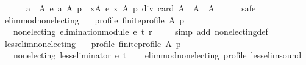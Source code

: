 \begin{isabellebody}
\ \ \ \ \ \ {\isacharbraceleft}{\kern0pt}a\ {\isasymin}\ A{\isachardot}{\kern0pt}\ e\ a\ A\ p\ {\isasymle}\ {\isacharparenleft}{\kern0pt}{\isasymSum}x{\isasymin}A{\isachardot}{\kern0pt}\ e\ x\ A\ p{\isacharparenright}{\kern0pt}\ div\ card\ A{\isacharbraceright}{\kern0pt}\ {\isasymunion}\ A\ {\isacharequal}{\kern0pt}\ A{\isachardoublequoteclose}\isanewline
\ \ \ \ \isamarkupfalse%
\ safe\isanewline
{}\isamarkupfalse%
%
\endisatagproof
{\isafoldproof}%
%
\isadelimproof
%
\endisadelimproof
%
\isadelimdocument
%
\endisadelimdocument
%
\isatagdocument
%
\isamarkuptrue%
%
\endisatagdocument
{\isafolddocument}%
%
\isadelimdocument
%
\endisadelimdocument
{}\isamarkupfalse%
\ elim{\isacharunderscore}{\kern0pt}mod{\isacharunderscore}{\kern0pt}non{\isacharunderscore}{\kern0pt}electing{\isacharcolon}{\kern0pt}\isanewline
\ \ \ profile{\isacharcolon}{\kern0pt}\ {\isachardoublequoteopen}finite{\isacharunderscore}{\kern0pt}profile\ A\ p{\isachardoublequoteclose}\isanewline
\ \ \ {\isachardoublequoteopen}non{\isacharunderscore}{\kern0pt}electing\ {\isacharparenleft}{\kern0pt}elimination{\isacharunderscore}{\kern0pt}module\ e\ t\ r\ {\isacharparenright}{\kern0pt}{\isachardoublequoteclose}\isanewline
%
\isadelimproof
\ \ %
\endisadelimproof
%
\isatagproof
{}\isamarkupfalse%
\ {\isacharparenleft}{\kern0pt}simp\ add{\isacharcolon}{\kern0pt}\ non{\isacharunderscore}{\kern0pt}electing{\isacharunderscore}{\kern0pt}def{\isacharparenright}{\kern0pt}%
\endisatagproof
{\isafoldproof}%
%
\isadelimproof
\isanewline
%
\endisadelimproof
\isanewline
{}\isamarkupfalse%
\ less{\isacharunderscore}{\kern0pt}elim{\isacharunderscore}{\kern0pt}non{\isacharunderscore}{\kern0pt}electing{\isacharcolon}{\kern0pt}\isanewline
\ \ \ profile{\isacharcolon}{\kern0pt}\ {\isachardoublequoteopen}finite{\isacharunderscore}{\kern0pt}profile\ A\ p{\isachardoublequoteclose}\isanewline
\ \ \ {\isachardoublequoteopen}non{\isacharunderscore}{\kern0pt}electing\ {\isacharparenleft}{\kern0pt}less{\isacharunderscore}{\kern0pt}eliminator\ e\ t{\isacharparenright}{\kern0pt}{\isachardoublequoteclose}\isanewline
%
\isadelimproof
\ \ %
\endisadelimproof
%
\isatagproof
{}\isamarkupfalse%
\ elim{\isacharunderscore}{\kern0pt}mod{\isacharunderscore}{\kern0pt}non{\isacharunderscore}{\kern0pt}electing\ profile\ less{\isacharunderscore}{\kern0pt}elim{\isacharunderscore}{\kern0pt}sound\isanewline
\ \ \isamarkupfalse%

\end{isabellebody}
